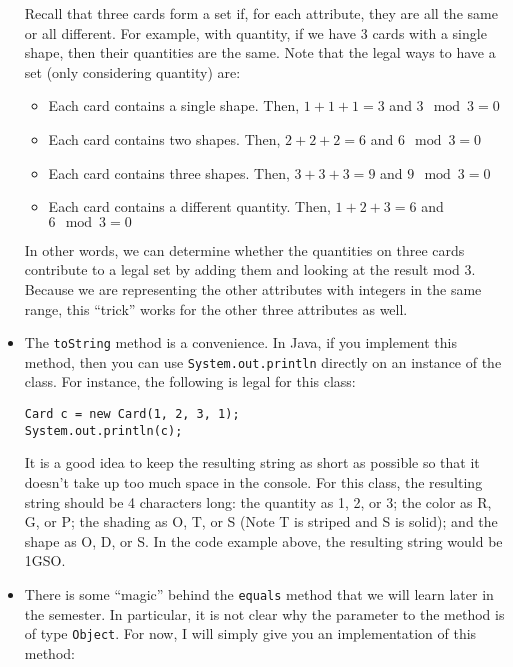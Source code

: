 \documentclass[11pt]{article}
\begin{document}
\begin{itemize}
  Recall that three cards form a set if, for each attribute, they are all the
  same or all different.  For example, with quantity, if we have 3 cards with a
  single shape, then their quantities are the same. Note that the legal ways to
  have a set (only considering quantity) are:

\begin{itemize}
\item Each card contains a single shape.  Then, $1 + 1 + 1 = 3$ and
  $3 \mod 3 = 0$
\item Each card contains two shapes.  Then, $2 + 2 + 2 = 6$ and $6 \mod 3 = 0$
\item Each card contains three shapes.  Then, $3 + 3 + 3 = 9$ and $9 \mod 3 = 0$
\item Each card contains a different quantity.  Then, $1 + 2 + 3 = 6$ and
  $6 \mod 3 = 0$
\end{itemize}

In other words, we can determine whether the quantities on three cards
contribute to a legal set by adding them and looking at the result mod 3.
Because we are representing the other attributes with integers in the same
range, this ``trick'' works for the other three attributes as well.

\item The {\tt toString} method is a convenience.  In Java, if you implement
  this method, then you can use {\tt System.out.println} directly on an
  instance of the class.  For instance, the following is legal for this class:

{\footnotesize
\begin{verbatim}
Card c = new Card(1, 2, 3, 1);
System.out.println(c);
\end{verbatim}}

  It is a good idea to keep the resulting string as short as possible so that
  it doesn't take up too much space in the console.  For this class, the
  resulting string should be 4 characters long: the quantity as 1, 2, or 3; the
  color as R, G, or P; the shading as O, T, or S (Note T is striped and S is
  solid); and the shape as O, D, or S.  In the code example above, the
  resulting string would be 1GSO.

\item There is some ``magic'' behind the {\tt equals} method that we will learn
  later in the semester.  In particular, it is not clear why the parameter to
  the method is of type {\tt Object}.  For now, I will simply give you an
  implementation of this method:


\end{itemize}
\end{document}
